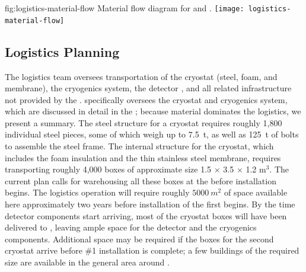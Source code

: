  
\begin{dunefigure}%
{fig:logistics-material-flow}
  {Material flow diagram for  and . }%
 \texttt{[image: logistics-material-flow]}
\end{dunefigure}

\subsection{Logistics Planning}
\label{sec:fdsp-tc-logPln}

The %
 logistics team oversees transportation of the cryostat (steel, foam, and membrane), the cryogenics system, the detector  , and all related infrastructure not provided by the . 
 specifically oversees the cryostat and cryogenics system, which are  discussed in detail in the  ; because  material dominates the logistics, we present a summary.  
The steel structure for a  cryostat requires roughly 1,800 individual steel pieces,  some of which weigh up to \SI{7.5}{t}, as well as \SI{125}{t} of bolts to assemble the steel frame. 
The internal structure for the cryostat, which includes the foam insulation and the thin stainless steel membrane, requires transporting roughly 4,000 boxes of approximate size  %
 1.5 $\times$ 3.5 $\times$ 1.2 m$^3$. 
 The current plan calls for warehousing all these boxes at the  before installation begins. 
The logistics operation will require roughly $\SI{5000}{m^2}$ of space available here  %
approximately two years before installation of the first  begins. 
By the time detector components start arriving, most of the cryostat boxes will have been delivered to , %
leaving ample space for the detector and the cryogenics components. %
Additional space may be required if the boxes for the second cryostat arrive before   \#1 installation is complete; a few buildings of the required size are available in the general area around . 

